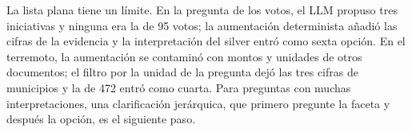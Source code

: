 La lista plana tiene un l\'imite. En la pregunta de los votos, el LLM propuso tres iniciativas y ninguna era la de 95 votos; la aumentaci\'on determinista a\~nadi\'o las cifras de la evidencia y la interpretaci\'on del silver entr\'o como sexta opci\'on. En el terremoto, la aumentaci\'on se contamin\'o con montos y unidades de otros documentos; el filtro por la unidad de la pregunta dej\'o las tres cifras de municipios y la de 472 entr\'o como cuarta. Para preguntas con muchas interpretaciones, una clarificaci\'on jer\'arquica, que primero pregunte la faceta y despu\'es la opci\'on, es el siguiente paso.
